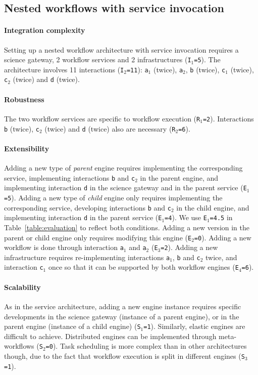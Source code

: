 \documentclass[preprint,3p,twocolumn]{elsarticle}
\begin{document}
\subsection{Nested workflows with service invocation}

\paragraph{Integration complexity} Setting up a nested workflow
architecture with service invocation requires a science gateway, 2
workflow services and 2 infrastructures (\texttt{I$_1$=5}). The
architecture involves 11 interactions (\texttt{I$_2$=11}):
\texttt{a$_1$} (twice), \texttt{a$_2$}, \texttt{b} (twice), \texttt{c$_1$} (twice),
\texttt{c$_2$} (twice) and
\texttt{d} (twice).

\paragraph{Robustness} The two workflow services are specific to
workflow execution (\texttt{R$_1$=2}). Interactions \texttt{b}
(twice), \texttt{c$_2$} (twice) and \texttt{d} (twice) also
are necessary (\texttt{R$_2$=6}).

\paragraph{Extensibility} Adding a new type of \emph{parent} engine
requires implementing the corresponding service,  implementing
interactions \texttt{b} and \texttt{c$_2$} in the parent engine, and
implementing interaction \texttt{d} in the science gateway and in the
parent service (\texttt{E$_1$=5}). Adding a new type of \emph{child}
engine only requires implementing the corresponding service, 
developing interactions \texttt{b} and \texttt{c$_2$} in the child
engine, and implementing interaction \texttt{d} in the parent service
(\texttt{E$_1$=4}). We use \texttt{E$_1$=4.5} in
Table~\ref{table:evaluation} to reflect both conditions. Adding a new
version in the parent or child engine only requires modifying this
engine (\texttt{E$_2$=0}). Adding a new workflow is done through
interaction \texttt{a$_1$} and \texttt{a$_2$}
(\texttt{E$_3$=2}). Adding a new infrastructure requires 
re-implementing interactions \texttt{a$_1$}, \texttt{b} and
\texttt{c$_2$} twice, and interaction \texttt{c$_1$} once so that it
can be supported by both workflow engines (\texttt{E$_4$=6}).

\paragraph{Scalability} As in the service architecture, adding a new
engine instance requires specific developments in the science gateway
(instance of a parent engine), or in the parent engine (instance of a
child engine) (\texttt{S$_1$=1}). Similarly, elastic engines are
difficult to achieve. Distributed engines can be implemented through meta-workflows (\texttt{S$_2$=0}). Task scheduling
is more complex than in other architectures though, due to the fact
that workflow execution is split in different engines (\texttt{S$_3$=1}).
\end{document}
